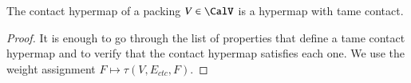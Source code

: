 \documentclass{llncs}
\begin{document}

\begin{theorem} The contact hypermap of a 
  packing $V\in \CalV$ is a hypermap with tame contact.
\end{theorem}
%
%
%
%

\begin{proof} It is enough to go through the list of properties that
  define a tame contact hypermap and to verify that the contact
  hypermap satisfies each one.  We use the weight assignment $F\mapsto
  \tau(V,E_{ctc},F)$.


\end{proof}
\end{document}
